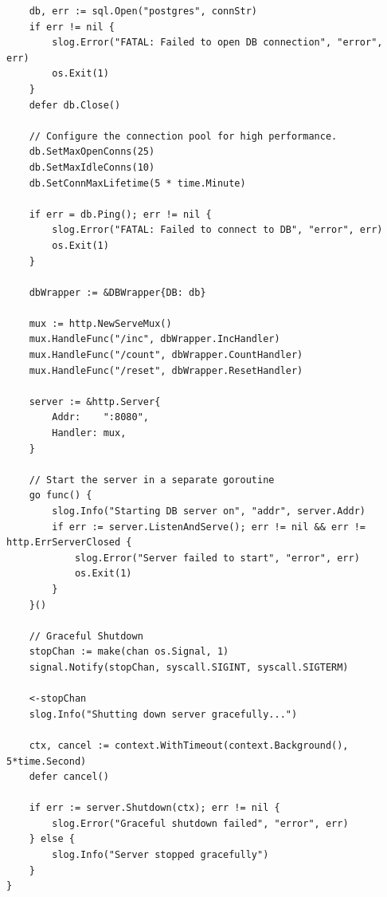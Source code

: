\documentclass[12pt,a4paper]{article}
\begin{document}
\begin{verbatim}
	db, err := sql.Open("postgres", connStr)
	if err != nil {
		slog.Error("FATAL: Failed to open DB connection", "error", err)
		os.Exit(1)
	}
	defer db.Close()

	// Configure the connection pool for high performance.
	db.SetMaxOpenConns(25)
	db.SetMaxIdleConns(10)
	db.SetConnMaxLifetime(5 * time.Minute)

	if err = db.Ping(); err != nil {
		slog.Error("FATAL: Failed to connect to DB", "error", err)
		os.Exit(1)
	}

	dbWrapper := &DBWrapper{DB: db}

	mux := http.NewServeMux()
	mux.HandleFunc("/inc", dbWrapper.IncHandler)
	mux.HandleFunc("/count", dbWrapper.CountHandler)
	mux.HandleFunc("/reset", dbWrapper.ResetHandler)

	server := &http.Server{
		Addr:    ":8080",
		Handler: mux,
	}

	// Start the server in a separate goroutine
	go func() {
		slog.Info("Starting DB server on", "addr", server.Addr)
		if err := server.ListenAndServe(); err != nil && err != http.ErrServerClosed {
			slog.Error("Server failed to start", "error", err)
			os.Exit(1)
		}
	}()

	// Graceful Shutdown
	stopChan := make(chan os.Signal, 1)
	signal.Notify(stopChan, syscall.SIGINT, syscall.SIGTERM)

	<-stopChan
	slog.Info("Shutting down server gracefully...")

	ctx, cancel := context.WithTimeout(context.Background(), 5*time.Second)
	defer cancel()

	if err := server.Shutdown(ctx); err != nil {
		slog.Error("Graceful shutdown failed", "error", err)
	} else {
		slog.Info("Server stopped gracefully")
	}
}
\end{verbatim}
\end{document}

